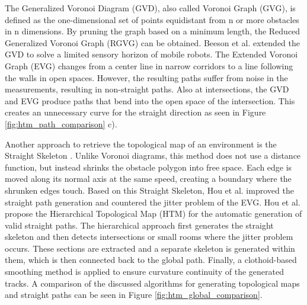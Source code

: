 The Generalized Voronoi Diagram (GVD), also called Voronoi Graph (GVG), is defined as the one-dimensional set of points equidistant from n or more obstacles in n dimensions. By pruning the graph based on a minimum length, the Reduced Generalized Voronoi Graph (RGVG) can be obtained. Beeson et al. \cite{beeson_towards_2005} extended the GVD to solve a limited sensory horizon of mobile robots. The Extended Voronoi Graph (EVG) changes from a center line in narrow corridors to a line following the walls in open spaces. However, the resulting paths suffer from noise in the measurements, resulting in non-straight paths. Also at intersections, the GVD and EVG produce paths that bend into the open space of the intersection. This creates an unnecessary curve for the straight direction as seen in Figure \ref{fig:htm_path_comparison} c).

Another approach to retrieve the topological map of an environment is the Straight Skeleton \cite{maurer_novel_1996}. Unlike Voronoi diagrams, this method does not use a distance function, but instead shrinks the obstacle polygon into free space. Each edge is moved along its normal axis at the same speed, creating a boundary where the shrunken edges touch. Based on this Straight Skeleton, Hou et al. \cite{hou_straight_2021} improved the straight path generation and countered the jitter problem of the EVG. Hou et al. propose the Hierarchical Topological Map (HTM) for the automatic generation of valid straight paths. The hierarchical approach first generates the straight skeleton and then detects intersections or small rooms where the jitter problem occurs. These sections are extracted and a separate skeleton is generated within them, which is then connected back to the global path. Finally, a clothoid-based smoothing method is applied to ensure curvature continuity of the generated tracks. A comparison of the discussed algorithms for generating topological maps and straight paths can be seen in Figure \ref{fig:htm_global_comparison}.

